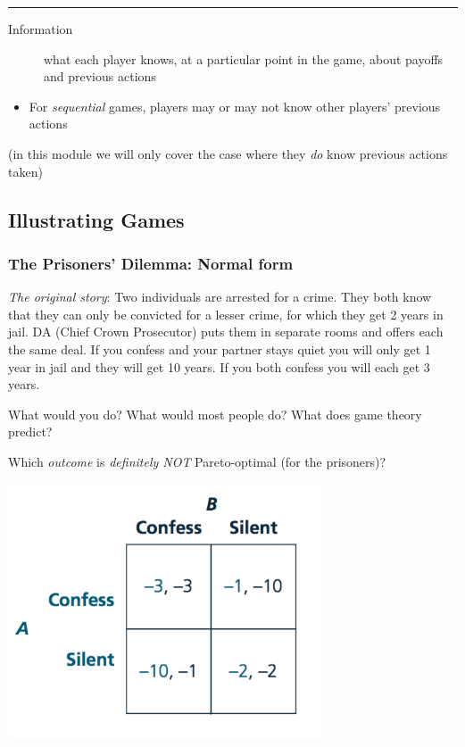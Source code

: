 \documentclass[]{article}
\providecommand{\tightlist}{%
  \setlength{\itemsep}{0pt}\setlength{\parskip}{0pt}}
\begin{document}
\begin{center}\rule{0.5\linewidth}{\linethickness}\end{center}

\begin{description}
\item[Information]
what each player knows, at a particular point in the game, about payoffs and previous actions
\end{description}

\begin{itemize}
\tightlist
\item
  For \emph{sequential} games, players may or may not know other players' previous actions
\end{itemize}

(in this module we will only cover the case where they \emph{do} know previous actions taken)

\hypertarget{illustrating-games}{%
\subsection{Illustrating Games}\label{illustrating-games}}

\hypertarget{the-prisoners-dilemma-normal-form}{%
\subsubsection{The Prisoners' Dilemma: Normal form}\label{the-prisoners-dilemma-normal-form}}

\emph{The original story}:
Two individuals are arrested for a crime. They both know that they can only be convicted for a lesser crime, for which they get 2 years in jail.
DA (Chief Crown Prosecutor) puts them in separate rooms and offers each the same deal.
If you confess and your partner stays quiet you will only get 1 year in jail and they will get 10 years.
If you both confess you will each get 3 years.

What would you do? What would most people do? What does game theory predict?

\bigskip

Which \emph{outcome} is \emph{definitely NOT} Pareto-optimal (for the prisoners)?

\includegraphics[height=3in]{picsfigs/pd_normal.png}
\end{document}

